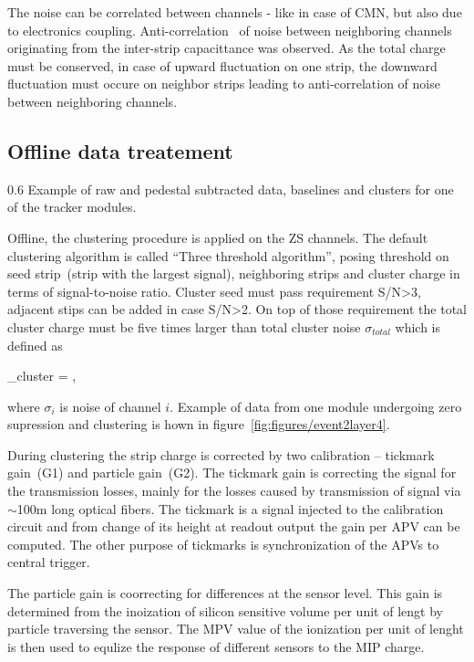 The noise can be correlated between channels - like in case of CMN, but also due to electronics coupling. Anti-correlation~\cite{Lutz:1987wd} of noise between neighboring channels originating from the inter-strip capacittance was observed. As the total charge must be conserved, in case of upward fluctuation on one strip, the downward fluctuation must occure on neighbor strips leading to anti-correlation of noise between neighboring channels.

\subsection{Offline data treatement}

                 {0.6}       %
                 {Example of raw and pedestal subtracted data, baselines and clusters for one of the tracker modules.} %

Offline, the clustering procedure is applied on the ZS channels. The default clustering algorithm is called ``Three threshold algorithm'', posing threshold on seed strip~(strip with the largest signal), neighboring strips and cluster charge in terms of signal-to-noise ratio. Cluster seed must pass requirement S/N>3, adjacent stips can be added in case S/N>2. On top of those requirement the total cluster charge must be five times larger than total cluster noise $\sigma_{total}$ which is defined as

{
    \sigma_{cluster} = ,
}

where $\sigma_{i}$ is noise of channel $i$. Example of data from one module undergoing zero supression and clustering is hown in figure~\ref{fig:figures/event2layer4}.

During clustering the strip charge is corrected by two calibration -- tickmark gain~(G1) and particle gain~(G2). The tickmark gain is correcting the signal for the transmission losses, mainly for the losses caused by transmission of signal via $\sim$100m long optical fibers. The tickmark is a signal injected to the calibration circuit and from change of its height at readout output the gain per APV can be computed. The other purpose of tickmarks is synchronization of the APVs to central trigger.

The particle gain is coorrecting for differences at the sensor level. This gain is determined from the inoization of silicon sensitive volume per unit of lengt by particle traversing the sensor. The MPV value of the ionization per unit of lenght is then used to equlize the response of different sensors to the MIP charge. 

